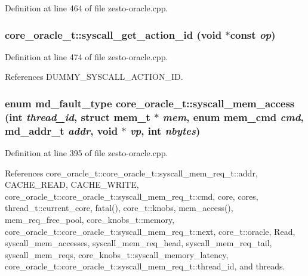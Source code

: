 Definition at line 464 of file zesto-oracle.cpp.
\subsubsection[{syscall\_\-get\_\-action\_\-id}]{ core\_\-oracle\_\-t::syscall\_\-get\_\-action\_\-id (void $\ast$const  {\em op})\hspace{0.3cm}{\tt  [static, protected]}}\label{classcore__oracle__t_16826da0aea8695f558397af8c0be45b}




Definition at line 474 of file zesto-oracle.cpp.

References DUMMY\_\-SYSCALL\_\-ACTION\_\-ID.
\subsubsection[{syscall\_\-mem\_\-access}]{\setlength{\rightskip}{0pt plus 5cm}enum {\bf md\_\-fault\_\-type} core\_\-oracle\_\-t::syscall\_\-mem\_\-access (int {\em thread\_\-id}, \/  struct {\bf mem\_\-t} $\ast$ {\em mem}, \/  enum {\bf mem\_\-cmd} {\em cmd}, \/  {\bf md\_\-addr\_\-t} {\em addr}, \/  void $\ast$ {\em vp}, \/  int {\em nbytes})\hspace{0.3cm}{\tt  [static]}}\label{classcore__oracle__t_e266894eeb549a7421ac488d9b18edaf}




Definition at line 395 of file zesto-oracle.cpp.

References core\_\-oracle\_\-t::core\_\-oracle\_\-t::syscall\_\-mem\_\-req\_\-t::addr, CACHE\_\-READ, CACHE\_\-WRITE, core\_\-oracle\_\-t::core\_\-oracle\_\-t::syscall\_\-mem\_\-req\_\-t::cmd, core, cores, thread\_\-t::current\_\-core, fatal(), core\_\-t::knobs, mem\_\-access(), mem\_\-req\_\-free\_\-pool, core\_\-knobs\_\-t::memory, core\_\-oracle\_\-t::core\_\-oracle\_\-t::syscall\_\-mem\_\-req\_\-t::next, core\_\-t::oracle, Read, syscall\_\-mem\_\-accesses, syscall\_\-mem\_\-req\_\-head, syscall\_\-mem\_\-req\_\-tail, syscall\_\-mem\_\-reqs, core\_\-knobs\_\-t::syscall\_\-memory\_\-latency, core\_\-oracle\_\-t::core\_\-oracle\_\-t::syscall\_\-mem\_\-req\_\-t::thread\_\-id, and threads.
